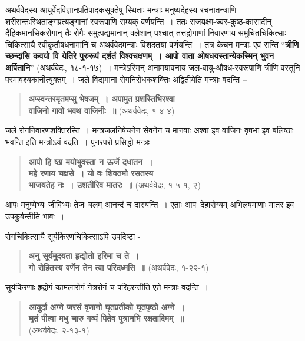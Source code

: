 {अथर्ववेदस्य आयुर्वेदविज्ञानप्रतिपादकसूक्तेषु स्थिताः मन्त्राः मनुष्यदेहस्य रचनातन्त्राणि \-शरीरान्तःस्थिताङ्गप्रत्यङ्गानां स्वरूपाणि सम्यक् वर्णयन्ति~। ततः राजयक्ष्म-ज्वर-कुष्ठ-\break कासादीन् दैहिकमानसिकरोगान् तैः रोगैः समुत्पद्यमानान् क्लेशान् पश्चात् तत्तद्रोगाणां \break निवारणाय समुचितचिकित्साः चिकित्सायै स्वीकृतौषधनामानि च अथर्ववेदमन्त्राः विशदतया वर्णयन्ति~। तत्र केचन मन्त्राः एवं सन्ति “\textbf{त्रीणि च्छन्दांसि कवयो वि येतिरे \-पुरुरूपं दर्शतं विश्वचक्षणम्~। आपो वाता ओषधयस्तान्येकस्मिन् भुवन अर्पितानि}” \-(अथर्ववेदः, १८-१-१७)~। मन्त्रेऽस्मिन् अनामयावनाय जल-वायु-औषध-स्वरूपाणि \-त्रीणि वस्तूनि परमावश्यकानीत्युक्तम्~। जले विद्यमाना रोगनिरोधकशक्तिः अद्वितीयेति मन्त्राः वदन्ति –
\begin{verse}
\textbf{अप्स्वन्तरमृतमप्सु भेषजम्~। अपामुत प्रशस्तिभिरश्वा}\\
\textbf{वाजिनो गावो भवथ वाजिनीः~॥} (अथर्ववेदः, १-४-४)
\end{verse}
जले रोगनिवारणशक्तिरस्ति~। मन्त्रजलनिषेचनेन सेवनेन च मानवाः अश्वा इव वाजिनः वृषभा इव बलिष्ठाः भवन्ति इति मन्त्रोऽयं वदति~। पुनरपरो प्रसिद्धो मन्त्रः –

\begin{verse}
\textbf{आपो हि ष्ठा मयोभुवस्ता न ऊर्जे दधातन~। }\\
\textbf{महे रणाय चक्षसे~। यो वः शिवतमो रसतस्य}\\
\textbf{भाजयतेह नः~। उशतीरिव मातरः~॥} (अथर्ववेदः, १-५-१, २)
\end{verse}

आपः मनुष्येभ्यः जीविभ्यः तेजः बलम् आनन्दं च दास्यन्ति~। एताः आपः देहारोग्यम् अभिलषमाणाः मातर इव उपकुर्वन्तीति भावः~। 

रोगचिकित्सायै सूर्यकिरणचिकित्साऽपि उपदिष्टा -

\begin{verse}
\textbf{अनु सूर्यमुदयता हृद्योतो हरिमा च ते~। }\\
\textbf{गो रोहितस्य वर्णेन तेन त्वा परिदध्मसि~॥} (अथर्ववेदः, १-२२-१)
\end{verse}

सूर्यकिरणाः हृद्रोगं कामलारोगं नेत्ररोगं च परिहरन्तीति एते मन्त्राः वदन्ति~। 

\begin{verse}
\textbf{आयुर्दा अग्ने जरसं वृणानो घृतप्रतीको घृतपृष्ठो अग्ने~। }\\
\textbf{घृतं पीत्वा मधु चारु गव्यं पितेव पुत्रानभि रक्षतादिमम्~॥}\\
\hspace{6cm}(अथर्ववेदः, २-१३-१)
\end{verse}

}
